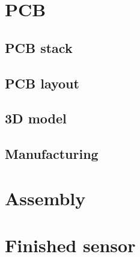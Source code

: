 \section{PCB}
    \subsection{PCB stack}
    \subsection{PCB layout}
    \subsection{3D model}
    \subsection{Manufacturing}

\section{Assembly}

\section{Finished sensor}
